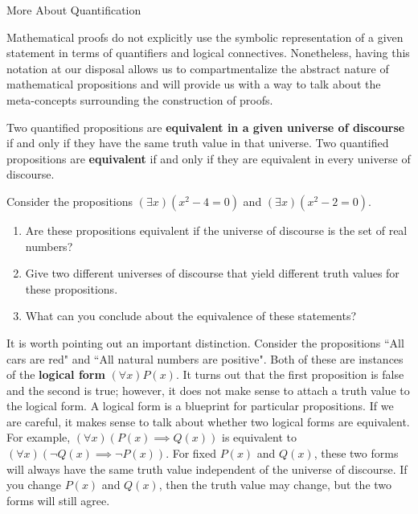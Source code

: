 \begin{section}{More About Quantification}

Mathematical proofs do not explicitly use the symbolic representation of a given statement in terms of quantifiers and logical connectives.  Nonetheless, having this notation at our disposal allows us to compartmentalize the abstract nature of mathematical propositions and will provide us with a way to talk about the meta-concepts surrounding the construction of proofs.

\begin{definition}
Two quantified propositions are \textbf{equivalent in a given universe of discourse} if and only if they have the same truth value in that universe.  Two quantified propositions are \textbf{equivalent} if and only if they are equivalent in every universe of discourse.
\end{definition}

\begin{exercise}
Consider the propositions $(\exists x)(x^2-4=0)$ and $(\exists x)(x^2-2=0)$.  
\begin{enumerate}[label=\textrm{(\alph*)}]
\item Are these propositions equivalent if the universe of discourse is the set of real numbers?
\item Give two different universes of discourse that yield different truth values for these propositions.  
\item What can you conclude about the equivalence of these statements?
\end{enumerate}
\end{exercise}

It is worth pointing out an important distinction.  Consider the propositions ``All cars are red" and ``All natural numbers are positive".  Both of these are instances of the \textbf{logical form} $(\forall x)P(x)$.  It turns out that the first proposition is false and the second is true; however, it does not make sense to attach a truth value to the logical form.  A logical form is a blueprint for particular propositions.  If we are careful, it makes sense to talk about whether two logical forms are equivalent.  For example, $(\forall x)(P(x)\implies Q(x))$ is equivalent to $(\forall x)(\neg Q(x)\implies \neg P(x))$.  For fixed $P(x)$ and $Q(x)$, these two forms will always have the same truth value independent of the universe of discourse.  If you change $P(x)$ and $Q(x)$, then the truth value may change, but the two forms will still agree.


\end{section}
